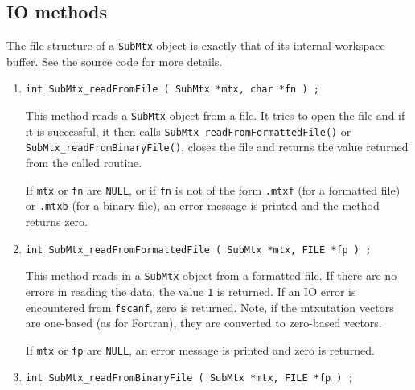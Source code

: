 \subsection{IO methods}
\label{subsection:SubMtx:proto:IO}
\par
The file structure of a {\tt SubMtx} object is exactly that of its
internal workspace buffer. See the source code for more details.
\par
\begin{enumerate}
\item
\begin{verbatim}
int SubMtx_readFromFile ( SubMtx *mtx, char *fn ) ;
\end{verbatim}
\par
This method reads a {\tt SubMtx} object from a file.
It tries to open the file and if it is successful, 
it then calls {\tt SubMtx\_readFromFormattedFile()} or
{\tt SubMtx\_readFromBinaryFile()}, 
closes the file
and returns the value returned from the called routine.
\par {}
If {\tt mtx} or {\tt fn} are {\tt NULL}, 
or if {\tt fn} is not of the form
{\tt *.mtxf} (for a formatted file) 
or {\tt *.mtxb} (for a binary file),
an error message is printed and the method returns zero.
\item
\begin{verbatim}
int SubMtx_readFromFormattedFile ( SubMtx *mtx, FILE *fp ) ;
\end{verbatim}
\par
This method reads in a {\tt SubMtx} object from a formatted file.
If there are no errors in reading the data, 
the value {\tt 1} is returned.
If an IO error is encountered from {\tt fscanf}, zero is returned.
Note, if the mtxutation vectors are one-based (as for Fortran),
they are converted to zero-based vectors.
\par {}
If {\tt mtx} or {\tt fp} are {\tt NULL},
an error message is printed and zero is returned.
\item
\begin{verbatim}
int SubMtx_readFromBinaryFile ( SubMtx *mtx, FILE *fp ) ;

\end{verbatim}
\end{enumerate}
